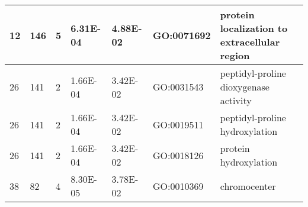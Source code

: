 \begin{landscape}
\begin{table}[h!]
\begin{tabular}{|l|l|l|l|l|l|l|}
12               & 146                                                                   & 5                                                                    & 6.31E-04         & 4.88E-02                                                             & GO:0071692       & protein localization to extracellular region                                                            \\ \hline
26               & 141                                                                   & 2                                                                    & 1.66E-04         & 3.42E-02                                                             & GO:0031543       & peptidyl-proline dioxygenase activity                                                                   \\ \hline
26               & 141                                                                   & 2                                                                    & 1.66E-04         & 3.42E-02                                                             & GO:0019511       & peptidyl-proline hydroxylation                                                                          \\ \hline
26               & 141                                                                   & 2                                                                    & 1.66E-04         & 3.42E-02                                                             & GO:0018126       & protein hydroxylation                                                                                   \\ \hline
38               & 82                                                                    & 4                                                                    & 8.30E-05         & 3.78E-02                                                             & GO:0010369       & chromocenter                                                                                            \\ \hline
\end{tabular}
\end{table}
\end{landscape}
